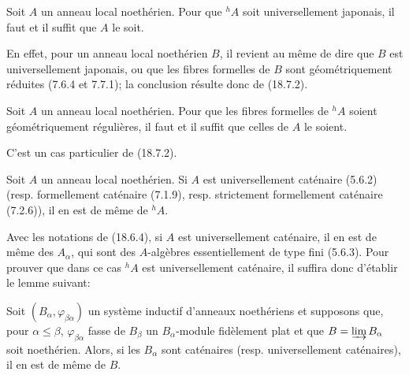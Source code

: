 \begin{corollary}[18.7.3]
\label{IV.18.7.3}
Soit $A$ un anneau local noethérien. Pour que ${}^h\!A$ soit universellement japonais, il faut et il suffit que $A$ le soit.
\end{corollary}

En effet, pour un anneau local noethérien $B$, il revient au même de dire que $B$ est universellement japonais, ou que les fibres formelles de $B$ sont géométriquement réduites (7.6.4 et 7.7.1); la conclusion résulte donc de (18.7.2).

\begin{corollary}[18.7.4]
\label{IV.18.7.4}
Soit $A$ un anneau local noethérien. Pour que les fibres formelles de ${}^h\!A$ soient géométriquement régulières, il faut et il suffit que celles de $A$ le soient.
\end{corollary}

C'est un cas particulier de (18.7.2).

\begin{proposition}[18.7.5]
\label{IV.18.7.5}
Soit $A$ un anneau local noethérien. Si $A$ est universellement caténaire \textup{(5.6.2) (resp.} formellement caténaire \textup{(7.1.9), resp.} strictement formellement caténaire \textup{(7.2.6))}, il en est de même de ${}^h\!A$.
\end{proposition}

Avec les notations de (18.6.4), si $A$ est universellement caténaire, il en est de même des $A_\alpha$, qui sont des $A$-algèbres essentiellement de type fini (5.6.3). Pour prouver que dans ce cas ${}^h\!A$ est universellement caténaire, il suffira donc d'établir le lemme suivant:

\begin{lemma}[18.7.5.1]
\label{IV.18.7.5.1}
Soit $(B_\alpha,\varphi_{\beta\alpha})$ un système inductif d'anneaux noethériens et supposons que, pour $\alpha\leq\beta$, $\varphi_{\beta\alpha}$ fasse de $B_\beta$ un $B_\alpha$-module fidèlement plat et que $B=\varinjlim B_\alpha$ soit noethérien. Alors, si les $B_\alpha$ sont caténaires \textup{(resp.} universellement caténaires\textup{)}, il en est de même de $B$.
\end{lemma}

